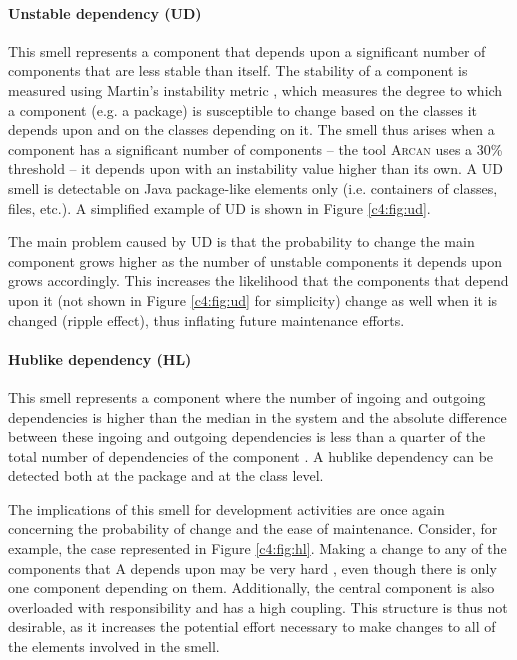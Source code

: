 \paragraph{Unstable dependency (UD)}\label{c4:sec:arch-smells-ud}
This smell represents a component that depends upon a significant number of components that are less stable than itself.
The stability of a component is measured using Martin's instability metric \cite{Martin2018}, which measures the degree to which a component (e.g. a package) is susceptible to change based on the classes it depends upon and on the classes depending on it.
The smell thus arises when a component has a significant number of components -- the tool \textsc{Arcan} uses a 30\% threshold \cite{Arcelli2017} -- it depends upon with an instability value higher than its own.
A UD smell is detectable on Java package-like elements only (i.e. containers of classes, files, etc.). A simplified example of UD is shown in Figure \ref{c4:fig:ud}. 

The main problem caused by UD is that the probability to change the main component grows higher as the number of unstable components it depends upon grows accordingly. This increases the likelihood that the components that depend upon it (not shown in Figure \ref{c4:fig:ud} for simplicity) change as well when it is changed (ripple effect), thus inflating future maintenance efforts.

\paragraph{Hublike dependency (HL)}\label{c4:sec:arch-smells-hl}
This smell represents a component where the number of ingoing and outgoing dependencies is higher than the median in the system and the absolute difference between these ingoing and outgoing dependencies is less than a quarter of the total number of dependencies of the component \cite{Arcelli2016}. A hublike dependency can be detected both at the package and at the class level.

The implications of this smell for development activities are once again concerning the probability of change and the ease of maintenance. Consider, for example, the case represented in Figure \ref{c4:fig:hl}.
Making a change to any of the components that A depends upon may be very hard \cite{Martin2018}, even though there is only one component depending on them.
Additionally, the central component is also overloaded with responsibility and has a high coupling.
This structure is thus not desirable, as it increases the potential effort necessary to make changes to all of the elements involved in the smell.

